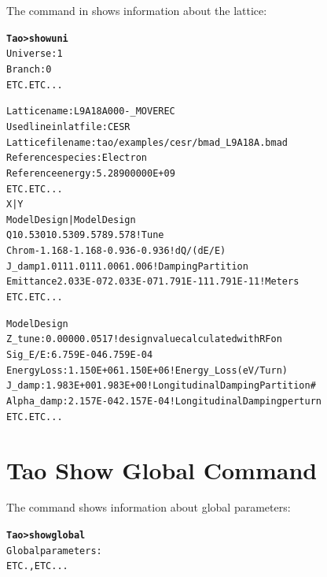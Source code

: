 \documentclass{hitec}
\newcommand{\BF}[1]{{\normalfont\textbf{#1}}}
\newenvironment{display}
  {\vspace*{-1.5ex} \begin{alltt}}
  {\end{alltt} \vspace*{-1.0ex}}
\begin{document}
The \tao {} command in \tao shows information about the lattice:
\begin{display}
  \BF{Tao> show uni} 
  Universe:        1
  Branch:          0
  ETC. ETC...

  Lattice name:           L9A18A000-_MOVEREC
  Used line in lat file:  CESR
  Lattice file name:      tao/examples/cesr/bmad_L9A18A.bmad
  Reference species:      Electron
  Reference energy:         5.28900000E+09
  ETC. ETC...
                        X          |            Y
                 Model     Design  |     Model     Design
          Q     10.530     10.530        9.578      9.578  ! Tune
      Chrom     -1.168     -1.168       -0.936     -0.936  ! dQ/(dE/E)
     J_damp      1.011      1.011        1.006      1.006  ! Damping Partition
  Emittance  2.033E-07  2.033E-07    1.791E-11  1.791E-11  ! Meters
  ETC. ETC...

                   Model     Design
      Z_tune:     0.0000     0.0517   ! design value calculated with RF on
     Sig_E/E:  6.759E-04  6.759E-04
 Energy Loss:  1.150E+06  1.150E+06   ! Energy_Loss (eV / Turn)
      J_damp:  1.983E+00  1.983E+00   ! Longitudinal Damping Partition #
  Alpha_damp:  2.157E-04  2.157E-04   ! Longitudinal Damping per turn
  ETC. ETC...
\end{display}

\section{Tao Show Global Command}

The \tao {} command shows information about global parameters:
\begin{display}
  \BF{Tao> show global}
  Global parameters:
    ETC., ETC...
\end{display}

\end{document}
